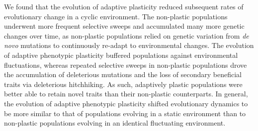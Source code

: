 We found that the evolution of adaptive plasticity reduced subsequent rates of evolutionary change in a cyclic environment.
The non-plastic populations underwent more frequent selective sweeps and accumulated many more genetic changes over time, as non-plastic populations relied on genetic variation from \textit{de novo} mutations to continuously re-adapt to environmental changes. 
The evolution of adaptive phenotypic plasticity buffered populations against environmental fluctuations, whereas repeated selective sweeps in non-plastic populations drove the accumulation of deleterious mutations and the loss of secondary beneficial traits via deleterious hitchhiking.
As such, adaptively plastic populations were better able to retain novel traits than their non-plastic counterparts.
In general, the evolution of adaptive phenotypic plasticity shifted evolutionary dynamics to be more similar to that of populations evolving in a static environment than to non-plastic populations evolving in an identical fluctuating environment. 

